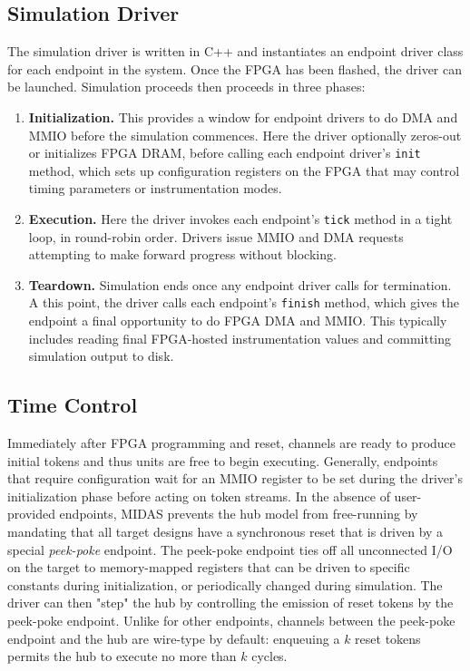 \subsection{Simulation Driver}

The simulation driver is written in C++ and instantiates an endpoint driver class for each endpoint
in the system. Once the FPGA has been flashed, the driver can be launched.
Simulation proceeds then proceeds in three phases:

\begin{enumerate}
    \item \textbf{Initialization.} This provides a window for endpoint drivers to do DMA
        and MMIO before the simulation commences.  Here the driver optionally
        zeros-out or initializes FPGA DRAM, before calling each endpoint
        driver's \texttt{init} method, which sets up configuration registers on
        the FPGA that may control timing parameters or instrumentation modes.

    \item \textbf{Execution.} Here the driver invokes each endpoint's \texttt{tick}
        method in a tight loop, in round-robin order.  Drivers issue MMIO and
        DMA requests attempting to make forward progress without blocking.

    \item \textbf{Teardown.} Simulation ends once any endpoint driver calls for
        termination. A this point, the driver calls each endpoint's \texttt{finish} method,
        which gives the endpoint a final opportunity to do FPGA DMA and MMIO. This
        typically includes reading final FPGA-hosted instrumentation values and committing simulation output to disk.
\end{enumerate}

\subsection{Time Control}
Immediately after FPGA programming and reset, channels are ready to produce initial tokens and thus units are free
to begin executing. Generally, endpoints that require
configuration wait for an MMIO register to be set during the driver's
initialization phase before acting on token streams. In the absence of
user-provided endpoints, MIDAS prevents the hub model from free-running by
mandating that all target designs have a synchronous reset that is driven
by a special \emph{peek-poke} endpoint. The peek-poke endpoint ties off all
unconnected I/O on the target to memory-mapped registers
that can be driven to specific constants during initialization, or
periodically changed during simulation. The driver can then "step" the hub
by controlling the emission of reset tokens by the peek-poke endpoint.
Unlike for other endpoints, channels between the peek-poke endpoint and the hub are wire-type by default: enqueuing a $k$ reset
tokens permits the hub to execute no more than $k$ cycles.

